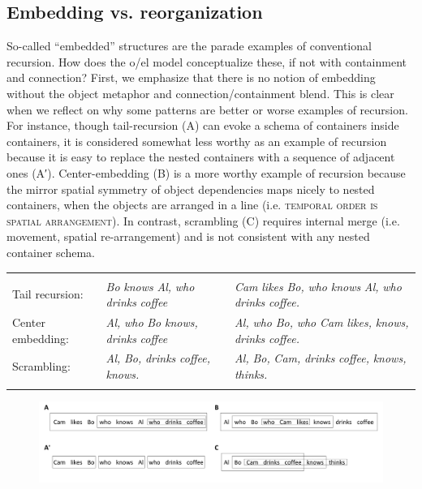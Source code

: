\subsection{Embedding vs. reorganization}

So-called “embedded” structures are the parade examples of conventional recursion. How does the o/el model conceptualize these, if not with containment and connection? First, we emphasize that there is no notion of embedding without the object metaphor and connection/containment blend. This is clear when we reflect on why some patterns are better or worse examples of recursion. For instance, though tail-recursion (A) can evoke a schema of containers inside containers, it is considered somewhat less worthy as an example of recursion because it is easy to replace the nested containers with a sequence of adjacent ones (A′). Center-embedding (B) is a more worthy example of recursion because the mirror spatial symmetry of object dependencies maps nicely to nested containers, when the objects are arranged in a line (i.e. \textsc{temporal} \textsc{order} \textsc{is} \textsc{spatial} \textsc{arrangement}). In contrast, scrambling (C) requires internal merge (i.e. movement, spatial re-arrangement) and is not consistent with any nested container schema.

\begin{tabularx}{\textwidth}{XXX} &  & \\
\lsptoprule
Tail recursion: & \textit{Bo} \textit{knows} \textit{Al,} \textit{who} \textit{drinks} \textit{coffee} & \textit{Cam} \textit{likes} \textit{Bo,} \textit{who} \textit{knows} \textit{Al,} \textit{who} \textit{drinks} \textit{coffee.}\\
Center embedding: & \textit{Al,} \textit{who} \textit{Bo} \textit{knows,} \textit{drinks} \textit{coffee} & \textit{Al,} \textit{who} \textit{Bo,} \textit{who} \textit{Cam} \textit{likes,} \textit{knows,} \textit{drinks} \textit{coffee.}\\
Scrambling: & \textit{Al,} \textit{Bo,} \textit{drinks} \textit{coffee,} \textit{knows.} & \textit{Al,} \textit{Bo,} \textit{Cam,} \textit{drinks} \textit{coffee,} \textit{knows,} \textit{thinks.}\\
\lspbottomrule
\end{tabularx}
  
\begin{figure}
\includegraphics[width=\textwidth]{figures/Tilsen-img118.png}
\caption{\missingcaption}
\label{fig:}
\end{figure}
 

